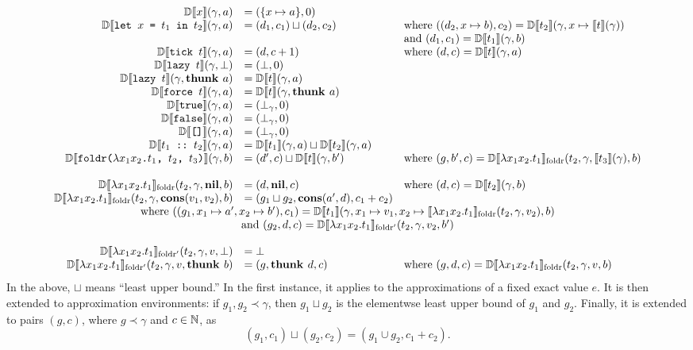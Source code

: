 \[
  \begin{array}{rll}
    \ED{x}{\gamma}{a} &= (\braces{x \mapsto a}, 0) \\
    \ED{\tlet{x}{t_1}{t_2}}{\gamma}{a} &= (d_1, c_1) \sqcup (d_2, c_2) &\text{where } ((d_2, x \mapsto b), c_2) = \ED{t_2}{\gamma}{x \mapsto \EE{t}{\gamma}} \\
                      &&\text{and } (d_1, c_1) = \ED{t_1}{\gamma}{b} \\
    \ED{\ttick{t}}{\gamma}{a} &= (d, c + 1) &\text{where } (d, c) = \ED{t}{\gamma}{a} \\
    \ED{\tlazy{t}}{\gamma}{\sundefined} &= (\sundefined, 0) \\
    \ED{\tlazy{t}}{\gamma}{\sthunk{a}} &= \ED{t}{\gamma}{a} \\
    \ED{\tforce{t}}{\gamma}{a} &= \ED{t}{\gamma}{\sthunk{a}} \\
    \ED{\ttrue}{\gamma}{a} &= (\sundefined_\gamma, 0) \\
    \ED{\tfalse}{\gamma}{a} &= (\sundefined_\gamma, 0) \\
    \ED{\tnil}{\gamma}{a} &= (\sundefined_\gamma, 0) \\
    \ED{\tcons{t_1}{t_2}}{\gamma}{a} &= \ED{t_1}{\gamma}{a} \sqcup \ED{t_2}{\gamma}{a} \\
    \ED{\tfoldr{x_1}{x_2}{t_1}{t_2}{t_3}}{\gamma}{b} &= (d', c) \sqcup \ED{t}{\gamma}{b'} &\text{where } (g, b', c) = \EDF{x_1}{x_2}{t_1}{t_2}{\gamma}{\EE{t_3}{\gamma}}{b} \\ \\
    \EDF{x_1}{x_2}{t_1}{t_2}{\gamma}{\snil}{b} &= (d, \snil, c) & \text{where } (d, c) = \ED{t_2}{\gamma}{b} \\
    \EDF{x_1}{x_2}{t_1}{t_2}{\gamma}{\scons{v_1}{v_2}}{b} &= (g_1 \sqcup g_2, \scons{a'}{d}, c_1 + c_2) \\
    \multicolumn{3}{c}{\text{where } ((g_1, x_1 \mapsto a', x_2 \mapsto b'), c_1) = \ED{t_1}{\gamma, x_1 \mapsto v_1, x_2 \mapsto \EEF{x_1}{x_2}{t_1}{t_2}{\gamma}{v_2}}{b}} \\
    \multicolumn{3}{c}{\text{and } (g_2, d, c) = \EDFF{x_1}{x_2}{t_1}{t_2}{\gamma}{v_2}{b'}} \\
    \\
    \EDFF{x_1}{x_2}{t_1}{t_2}{\gamma}{v}{\sundefined} &= \bot \\
    \EDFF{x_1}{x_2}{t_1}{t_2}{\gamma}{v}{\sthunk{b}} &= (g, \sthunk{d}, c) &\text{where } (g, d, c) = \EDF{x_1}{x_2}{t_1}{t_2}{\gamma}{v}{b}
  \end{array}
\]
In the above, \(\sqcup\) means ``least upper bound.'' In the first instance, it
applies to the approximations of a fixed exact value \(e\).  It is then extended
to approximation environments: if \(g_1, g_2 \prec \gamma\), then
\(g_1 \sqcup g_2\) is the elementwse least upper bound of \(g_1\) and
\(g_2\). Finally, it is extended to pairs \((g, c)\), where \(g \prec \gamma\)
and \(c \in \mathbb{N}\), as
\[
  (g_1, c_1) \sqcup (g_2, c_2) = (g_1 \cup g_2, c_1 + c_2) .
\]

